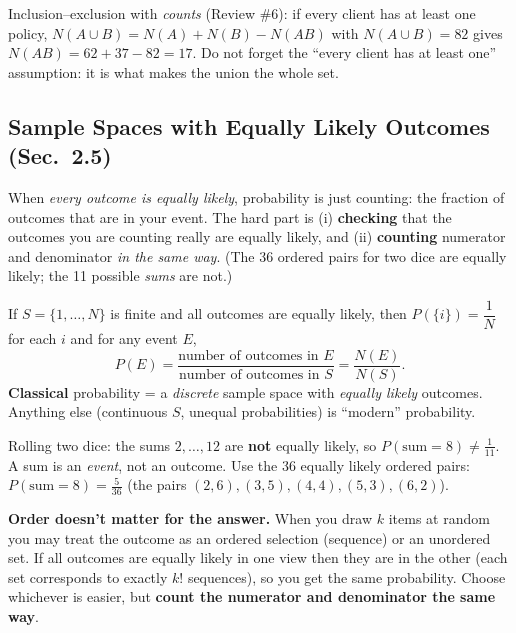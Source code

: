 \documentclass[11pt]{article}
\let\oldsubsection\subsection
\renewcommand{\subsection}{\Needspace{14\baselineskip}\oldsubsection}
\begin{document}
\begin{warnbox}
Inclusion--exclusion with \emph{counts} (Review \#6): if every client has at least one policy, $N(A\cup B)=N(A)+N(B)-N(AB)$ with $N(A\cup B)=82$ gives $N(AB)=62+37-82=17$. Do not forget the ``every client has at least one'' assumption: it is what makes the union the whole set.
\end{warnbox}

\subsection{Sample Spaces with Equally Likely Outcomes (Sec.\ 2.5)}

\begin{ideabox}
When \emph{every outcome is equally likely}, probability is just counting: the fraction of outcomes that are in your event. The hard part is (i) \textbf{checking} that the outcomes you are counting really are equally likely, and (ii) \textbf{counting} numerator and denominator \emph{in the same way}. (The 36 ordered pairs for two dice are equally likely; the 11 possible \emph{sums} are not.)
\end{ideabox}

\begin{defbox}
If $S=\{1,\dots,N\}$ is finite and all outcomes are equally likely, then $P(\{i\})=\dfrac1N$ for each $i$ and for any event $E$,
\[ P(E)=\frac{\text{number of outcomes in }E}{\text{number of outcomes in }S}=\frac{N(E)}{N(S)}. \]
\textbf{Classical} probability = a \emph{discrete} sample space with \emph{equally likely} outcomes. Anything else (continuous $S$, unequal probabilities) is ``modern'' probability.
\end{defbox}

\begin{warnbox}
Rolling two dice: the sums $2,\dots,12$ are \textbf{not} equally likely, so $P(\text{sum}=8)\ne\tfrac1{11}$. A sum is an \emph{event}, not an outcome. Use the 36 equally likely ordered pairs: $P(\text{sum}=8)=\tfrac5{36}$ (the pairs $(2,6),(3,5),(4,4),(5,3),(6,2)$).
\end{warnbox}

\textbf{Order doesn't matter for the answer.} When you draw $k$ items at random you may treat the outcome as an ordered selection (sequence) or an unordered set. If all outcomes are equally likely in one view then they are in the other (each set corresponds to exactly $k!$ sequences), so you get the same probability. Choose whichever is easier, but \textbf{count the numerator and denominator the same way}.
\end{document}
